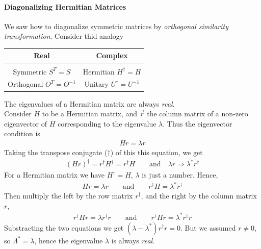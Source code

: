             \paragraph{Diagonalizing Hermitian Matrices} %
            \label{par:Diagonalizing Hermitian Matrices}
            We saw how to diagonalize symmetric matrices by \textit{orthogonal similarity transformation}. Consider thid analogy
            \begin{center}
                \begin{tabular}{c | c}
                    \hline Real & Complex \\ \hline \\
                    Symmetric $S^T = S$     & Hermitian $H^\dagger = H$ \\
                    Orthogonal $O^T = O^{-1}$ & Unitary $U^\dagger = U^{-1}$ \\
                    \hline
                \end{tabular}
            \end{center}
            \starpar The eigenvalues of a Hermitian matrix are always \textit{real}. \\
            Consider $H$ to be a Hermitian matrix, and $\vec{r}$ the column matrix of a non-zero
            eigenvector of $H$ corresponding to the eigenvalue $\lambda$. Thus the eigenvector condition is 
            \begin{align*}
                Hr = \lambda r
            \end{align*}
            Taking the transpose conjugate ($\dagger$) of this this equation, we get
            \begin{align*}
                (Hr)^\dagger = r^\dagger H^\dagger = r^\dagger H \qquad
                \text{and} \quad \lambda r \Rightarrow \lambda^* r^\dagger
            \end{align*}
            For a Hermitian matrix we have $H^\dagger = H$, $\lambda$ is just a number. Hence, 
            \begin{align*}
                Hr = \lambda r \qquad \text{and} \qquad r^\dagger H = \lambda^* r^\dagger
            \end{align*}
            Then multiply the left by the row matrix $r^\dagger$, and the right by the column matrix $r$,
            \begin{align*}
                r^\dagger Hr = \lambda r^\dagger r \qquad \text{and} \qquad r^\dagger H r = \lambda^* r^\dagger r
            \end{align*}
            Substracting the two equations we get  $(\lambda - \lambda^*) r^\dagger r = 0$. But we assumed $r \neq 0$, so $\Lambda^* = \lambda$, hence the eigenvalue 
            $\lambda$ is always \textit{real}.

